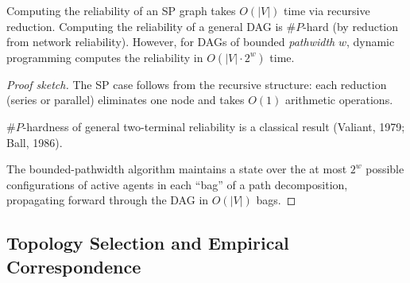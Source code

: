 \begin{theorem}
\label{thm:r4-complexity}
Computing the reliability of an SP graph takes $O(|V|)$ time via recursive
reduction.  Computing the reliability of a general DAG is $\#P$-hard (by
reduction from network reliability).  However, for DAGs of bounded
\emph{pathwidth} $w$, dynamic programming computes the reliability in
$O(|V| \cdot 2^w)$ time.
\end{theorem}

\begin{proof}[Proof sketch]
The SP case follows from the recursive structure: each reduction (series or
parallel) eliminates one node and takes $O(1)$ arithmetic operations.

$\#P$-hardness of general two-terminal reliability is a classical result
(Valiant, 1979; Ball, 1986).

The bounded-pathwidth algorithm maintains a state over the at most $2^w$
possible configurations of active agents in each ``bag'' of a path
decomposition, propagating forward through the DAG in $O(|V|)$ bags.
\end{proof}

\subsection{Topology Selection and Empirical Correspondence}

